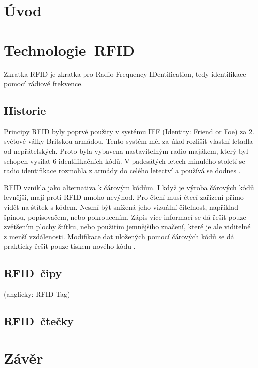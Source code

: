 
\chapter{Úvod}
\label{uvod}

\chapter{Technologie\ RFID}
\label{technologie_rfid}
Zkratka RFID je zkratka pro {Radio-Frequency IDentification}, tedy identifikace pomocí rádiové frekvence. 
\par


\section{Historie}
Principy RFID byly poprvé použity v systému IFF (Identity: Friend or Foe) za 2. světové války Britskou armádou. Tento systém měl za úkol rozlišit vlastní letadla od nepřátelských. Proto byla vybavena nastavitelným {radio-majákem}, který byl schopen vysílat 6 identifikačních kódů. V padesátých letech minulého století se radio identifikace rozmohla z armády do celého letectví a používá se dodnes\cite{The_RF_in_RFID} \cite{Emulator_UHD_RFID_Tagu}.
\par
RFID vznikla jako alternativa k čárovým kódům. I když je výroba čárových kódů levnější, mají proti RFID mnoho nevýhod. Pro čtení musí čtecí zařízení přímo vidět na štítek s kódem. Nesmí být snížená jeho vizuální čitelnost, například špínou, popisovačem, nebo pokroucením. Zápis více informací se dá řešit pouze zvětšením plochy štítku, nebo použitím jemnějšího značení, které je ale viditelné z menší vzdálenosti. Modifikace dat uložených pomocí čárových kódů se dá prakticky řešit pouze tiskem nového kódu\cite{The_RF_in_RFID} \cite{Emulator_UHD_RFID_Tagu}.


\section{RFID\ čipy}
(anglicky: RFID Tag)

\section{RFID\ čtečky}























\chapter{Závěr}
\label{zaver}


